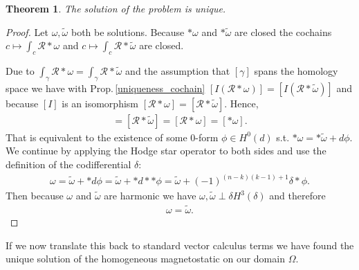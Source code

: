 \documentclass[12pt,a4paper]{article}
\newtheorem{theorem}{Theorem}
\theoremstyle{definition}
\newcommand{\rop}{\mathscr{R}} %
\begin{document}
\begin{theorem}
    The solution of the problem is unique.
\end{theorem}
\begin{proof}
    Let $\omega, \tilde{\omega}$ both be solutions. 
    Because  $*\omega$ and
    $*\tilde{\omega}$ are closed the cochains 
    $c\mapsto \int_c \rop*\omega$ and 
    $c\mapsto \int_c \rop*\tilde{\omega}$ are closed.
    
    Due to $\int_\gamma \rop *\omega = \int_\gamma \rop *\tilde{\omega}$ and the 
    assumption that $[\gamma]$ spans the homology space we have with 
    Prop.\,\ref{uniqueness_cochain} 
    $[I(\rop *\omega)] = [I(\rop *\tilde{\omega})]$
    and because $[I]$ is an isomorphism 
    $[\rop *\omega] = [\rop *\tilde{\omega}]$. Hence,
    \begin{align*}
    [*\tilde{\omega}] = [\rop *\tilde{\omega}] = 
    [\rop *\omega] = [*\omega].
    \end{align*}
    That is equivalent to the
    existence of some $0$-form $\phi \in H^0(d)$ s.t.
    $*\omega = *\tilde{\omega} + d\phi$. We continue by applying the Hodge
    star operator to both sides and use the definition of the codifferential 
    $\delta$:
    \begin{align*}
        \omega = \tilde{\omega} + *d\phi = \tilde{\omega} + *d**\phi 
        = \tilde{\omega} + (-1)^{(n-k)(k-1)+1}\delta * \phi.
    \end{align*}
    Then because $\omega$ and 
    $\tilde{\omega}$ are harmonic we have 
    $\omega, \tilde{\omega} \perp \delta H^{3}(\delta)$ and therefore 
    \begin{align*}
    \omega = \tilde{\omega}.    
    \end{align*}
\end{proof}
If we now translate this back to standard vector calculus terms we have found 
the unique solution of the homogeneous magnetostatic on our domain $\Omega$.

\end{document}
